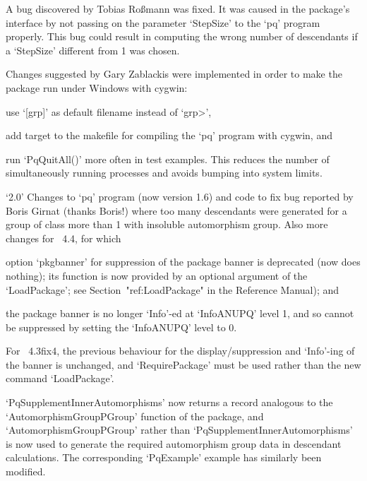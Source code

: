 \item{}
A bug discovered by Tobias Ro{\ss}mann was fixed. It was  caused  in  the
{\ANUPQ} package's interface by not passing on the  parameter  `StepSize'
to the `pq' program properly. This bug  could  result  in  computing  the
wrong number of descendants if a `StepSize' different from 1 was chosen.

\item{}
Changes suggested by Gary Zablackis were implemented in order to make the
package run under Windows with cygwin:

\itemitem{--}%
use `[grp]' as default filename instead of `\<grp>',

\itemitem{--}
add target to the makefile for compiling the `pq'  program  with  cygwin,
and

\itemitem{--} 
run `PqQuitAll()' more often in test examples. This reduces the number of
simultaneously running processes and avoids bumping into system limits.

\item{`2.0'}
Changes to `pq' program (now version 1.6) and  {\GAP}  code  to  fix  bug
reported by Boris Girnat (thanks Boris!) where too many descendants  were
generated for a group of class more than 1  with  insoluble  automorphism
group. Also more changes for {\GAP}~4.4, for which

\itemitem{--}%
option `pkgbanner' for suppression of the package  banner  is  deprecated
(now does nothing); its function is now provided by an optional  argument
of  the  `LoadPackage';  see  Section~"ref:LoadPackage"  in  the   {\GAP}
Reference Manual); and

\itemitem{--}
the package banner is no longer `Info'-ed at `InfoANUPQ' level 1, and  so
cannot be suppressed by setting the `InfoANUPQ' level to 0.

\item{}
For {\GAP}~4.3fix4, the previous behaviour  for  the  display/suppression
and `Info'-ing of the banner is unchanged, and `RequirePackage'  must  be
used rather than the new command `LoadPackage'.

\item{}
`PqSupplementInnerAutomorphisms' now returns a record  analogous  to  the
`AutomorphismGroupPGroup'  function  of  the  {\AutPGrp}   package,   and
`AutomorphismGroupPGroup' rather than `PqSupplementInnerAutomorphisms' is
now used to generate the required automorphism group data  in  descendant
calculations. The corresponding `PqExample' example  has  similarly  been
modified.

